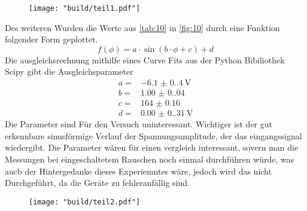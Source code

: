 \begin{figure}[H]
    \caption{}
    \label{fig:10}
    \centering
    \texttt{[image: "build/teil1.pdf"]}
\end{figure}
Des weiteren Wurden die Werte aus \autoref{tab:10} in \autoref{fig:10} durch eine Funktion 
folgender Form geplottet.
\begin{equation}
    f\left(\phi\right) = a \cdot \sin \left(b \cdot \phi + c\right) + d
\end{equation}
Die ausgleichsrechnung mithilfe eines Curve Fits aus der Python Bibiliothek Scipy gibt 
die Ausgleichsparameter 
\begin{align*}
    a = & \qty{-6.1(0.4)}{\volt}   \\
    b = & \qty{1.00(0.04)}{}     \\
    c = & \qty{164(0.16)}{}    \\
    d = & \qty{0.00(0.31)}{\volt}      
\end{align*}
Die Parameter sind Für den Versuch uninteressant. Wichtiger ist der gut erkennbare 
sinusförmige Verlauf der Spannungsamplitude, der das eingangssignal wiedergibt. Die Parameter 
wären für einen vergleich interessant, sovern man die Messungen bei eingeschaltetem Rauschen 
noch einmal durchführen würde, was aucb der Hintergedanke dieses Experiemntes wäre, jedoch wird 
das nicht Durchgeführt, da die Geräte zu fehleranfällig sind.



\begin{figure}[H]
    \caption{}
    \label{fig:11}
    \centering
    \texttt{[image: "build/teil2.pdf"]}
\end{figure}

\label{sec:Auswertung}
